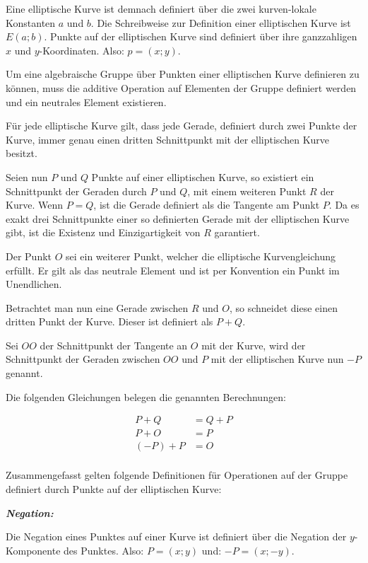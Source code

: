 Eine elliptische Kurve ist demnach definiert über die zwei kurven-lokale Konstanten $a$ und $b$.
Die Schreibweise zur Definition einer elliptischen Kurve ist $E(a;b)$.
Punkte auf der elliptischen Kurve sind definiert über ihre ganzzahligen $x$ und $y$-Koordinaten. Also: $p = (x;y)$.

Um eine algebraische Gruppe über Punkten einer elliptischen Kurve definieren zu können, muss die additive
Operation auf Elementen der Gruppe definiert werden und ein neutrales Element existieren.

Für jede elliptische Kurve gilt, dass jede Gerade, definiert durch zwei Punkte der Kurve, immer genau einen
dritten Schnittpunkt mit der elliptischen Kurve besitzt.

Seien nun $P$ und $Q$ Punkte auf einer elliptischen Kurve, so existiert ein Schnittpunkt der Geraden durch $P$
und $Q$, mit einem weiteren Punkt $R$ der Kurve. Wenn $P = Q$, ist die Gerade definiert als die Tangente am
Punkt $P$. Da es exakt drei Schnittpunkte einer so definierten Gerade mit der elliptischen Kurve gibt, 
ist die Existenz und Einzigartigkeit von $R$ garantiert.

Der Punkt $O$ sei ein weiterer Punkt, welcher die elliptische Kurvengleichung erfüllt. Er gilt als das neutrale
Element und ist per Konvention ein Punkt im Unendlichen.

Betrachtet man nun eine Gerade zwischen $R$ und $O$, so schneidet diese einen dritten Punkt der Kurve. 
Dieser ist definiert als $P + Q$.

Sei $OO$ der Schnittpunkt der Tangente an $O$ mit der Kurve, wird der Schnittpunkt der Geraden zwischen $OO$ und $P$ mit der elliptischen Kurve nun $-P$ genannt\cite{explicit_addition}.

Die folgenden Gleichungen belegen die genannten Berechnungen:

\begin{align*}
P + Q    &= Q + P \\
P + O    &= P \\
(-P) + P &= O \\
\end{align*}

Zusammengefasst gelten folgende Definitionen für Operationen auf der Gruppe definiert durch Punkte auf der 
elliptischen Kurve:


\textit{\textbf{Negation:}}

Die Negation eines Punktes auf einer Kurve ist definiert über die Negation der $y$-Komponente des Punktes.
Also: $P = (x;y)$ und: $-P = (x;-y)$.

